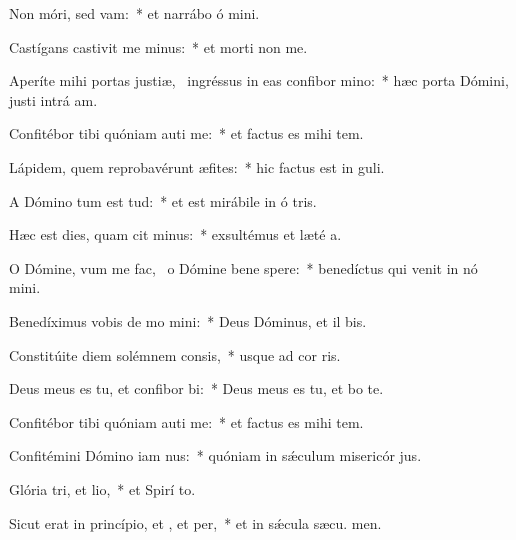 \item Non móri, sed vam:~* et narrábo ó mini.
\item Castígans castivit me minus:~* et morti non  me.
\item Aperíte mihi portas justiæ,~\pscross{} ingréssus in eas confibor mino:~* hæc porta Dómini, justi intrá  am.
\item Confitébor tibi quóniam auti me:~* et factus es mihi  tem.
\item Lápidem, quem reprobavérunt æfites:~* hic factus est in  guli.
\item A Dómino tum est tud:~* et est mirábile in ó tris.
\item Hæc est dies, quam cit minus:~* exsultémus et læté  a.
\item O Dómine, vum me fac,~\pscross{} o Dómine bene spere:~* benedíctus qui venit in nó mini.
\item Benedíximus vobis de mo mini:~* Deus Dóminus, et il bis.
\item Constitúite diem solémnem  consis,~* usque ad cor ris.
\item Deus meus es tu, et confibor bi:~* Deus meus es tu, et bo te.
\item Confitébor tibi quóniam auti me:~* et factus es mihi  tem.
\item Confitémini Dómino iam nus:~* quóniam in sǽculum misericór jus.
\item Glória tri, et lio,~* et Spirí to.
\item Sicut erat in princípio, et , et per,~* et in sǽcula sæcu. men.
